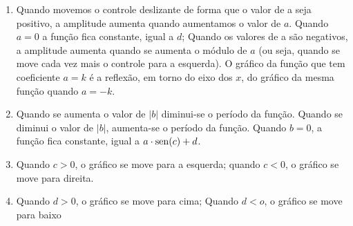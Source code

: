 \documentclass[10 pt,usenames,dvipsnames, oneside]{article}
\begin{document}
\ifdefined\prof
\begin{solucao}

\begin{enumerate}
\item Quando movemos o controle deslizante de forma que o valor de a seja positivo, a amplitude aumenta quando aumentamos o valor de $a$. Quando $a=0$ a função fica constante, igual a $d$; Quando os valores de a são negativos, a amplitude aumenta quando se aumenta o módulo de $a$ (ou seja, quando se move cada vez mais o controle para a esquerda). O gráfico da função que tem coeficiente $a = k$ é a reflexão, em torno do eixo dos $x$, do gráfico da mesma função quando $a = -k$.
\item Quando se aumenta o valor de $|b|$ diminui-se o período da função. Quando se diminui o valor de $|b|$, aumenta-se o período da função. Quando $b=0$, a função fica constante, igual a $a\cdot\operatorname{sen}(c)+d$.
\item Quando $c>0$, o gráfico se move para a esquerda; quando $c<0$, o gráfico se move para direita.
\item Quando $d>0$, o gráfico se move para cima; Quando $d<o$, o gráfico se move para baixo
\end{enumerate}

\end{solucao}
\fi
\end{document}
